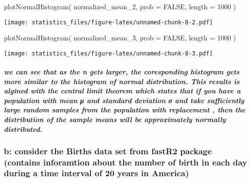 \documentclass[
]{article}
\newenvironment{Shaded}{\begin{snugshade}}{\end{snugshade}}
\newcommand{\AttributeTok}[1]{\textcolor[rgb]{0.77,0.63,0.00}{#1}}
\newcommand{\ConstantTok}[1]{\textcolor[rgb]{0.00,0.00,0.00}{#1}}
\newcommand{\DecValTok}[1]{\textcolor[rgb]{0.00,0.00,0.81}{#1}}
\newcommand{\FunctionTok}[1]{\textcolor[rgb]{0.00,0.00,0.00}{#1}}
\newcommand{\NormalTok}[1]{#1}
\begin{document}
\begin{Shaded}
\begin{Highlighting}[]
\FunctionTok{plotNormalHistogram}\NormalTok{( normalized\_mean\_2, }\AttributeTok{prob =} \ConstantTok{FALSE}\NormalTok{, }\AttributeTok{length =} \DecValTok{1000}\NormalTok{ )}
\end{Highlighting}
\end{Shaded}

\texttt{[image: statistics\_files/figure-latex/unnamed-chunk-8-2.pdf]}

\begin{Shaded}
\begin{Highlighting}[]
\FunctionTok{plotNormalHistogram}\NormalTok{( normalized\_mean\_3, }\AttributeTok{prob =} \ConstantTok{FALSE}\NormalTok{, }\AttributeTok{length =} \DecValTok{1000}\NormalTok{ )}
\end{Highlighting}
\end{Shaded}

\texttt{[image: statistics\_files/figure-latex/unnamed-chunk-8-3.pdf]}

\hypertarget{we-can-see-that-as-the-n-gets-larger-the-coresponding-histogram-gets-more-similar-to-the-histogram-of-normal-distribution.-this-results-is-algined-with-the-central-limit-theorem-which-states-that-if-you-have-a-population-with-mean-ux3bc-and-standard-deviation-ux3c3-and-take-sufficiently-large-random-samples-from-the-population-with-replacement-then-the-distribution-of-the-sample-means-will-be-approximately-normally-distributed.}{%
\subparagraph{we can see that as the n gets larger, the coresponding
histogram gets more similar to the histogram of normal distribution.
This results is algined with the central limit theorem which states that
if you have a population with mean μ and standard deviation σ and take
sufficiently large random samples from the population with replacement ,
then the distribution of the sample means will be approximately normally
distributed.}\label{we-can-see-that-as-the-n-gets-larger-the-coresponding-histogram-gets-more-similar-to-the-histogram-of-normal-distribution.-this-results-is-algined-with-the-central-limit-theorem-which-states-that-if-you-have-a-population-with-mean-ux3bc-and-standard-deviation-ux3c3-and-take-sufficiently-large-random-samples-from-the-population-with-replacement-then-the-distribution-of-the-sample-means-will-be-approximately-normally-distributed.}}

\hypertarget{b-consider-the-births-data-set-from-fastr2-package-contains-inforamtion-about-the-number-of-birth-in-each-day-during-a-time-interval-of-20-years-in-america}{%
\subsubsection{b: consider the Births data set from fastR2 package
(contains inforamtion about the number of birth in each day during a
time interval of 20 years in
America)}\label{b-consider-the-births-data-set-from-fastr2-package-contains-inforamtion-about-the-number-of-birth-in-each-day-during-a-time-interval-of-20-years-in-america}}
\end{document}

